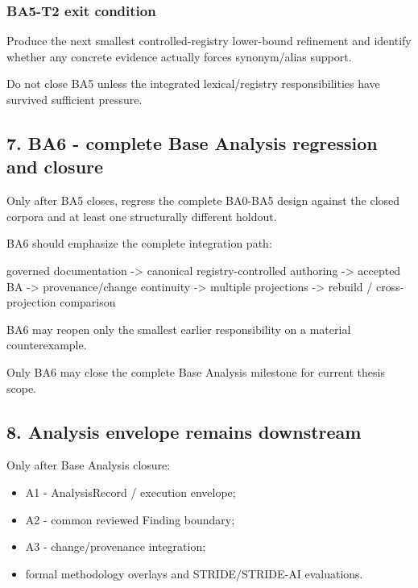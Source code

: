 \documentclass[
  10pt,
  a4paper,
]{article}
\newenvironment{Shaded}{}{}
\newcommand{\NormalTok}[1]{#1}
\providecommand{\tightlist}{%
  \setlength{\itemsep}{0pt}\setlength{\parskip}{0pt}}
\begin{document}
\subsubsection{BA5-T2 exit condition}\label{ba5-t2-exit-condition}

Produce the next smallest controlled-registry lower-bound refinement and
identify whether any concrete evidence actually forces synonym/alias
support.

Do not close BA5 unless the integrated lexical/registry responsibilities
have survived sufficient pressure.

\subsection{7. BA6 - complete Base Analysis regression and
closure}\label{ba6---complete-base-analysis-regression-and-closure}

Only after BA5 closes, regress the complete BA0-BA5 design against the
closed corpora and at least one structurally different holdout.

BA6 should emphasize the complete integration path:

\begin{Shaded}
\begin{Highlighting}[]
\NormalTok{governed documentation}
\NormalTok{ {-}\textgreater{} canonical registry{-}controlled authoring}
\NormalTok{ {-}\textgreater{} accepted BA}
\NormalTok{ {-}\textgreater{} provenance/change continuity}
\NormalTok{ {-}\textgreater{} multiple projections}
\NormalTok{ {-}\textgreater{} rebuild / cross{-}projection comparison}
\end{Highlighting}
\end{Shaded}

BA6 may reopen only the smallest earlier responsibility on a material
counterexample.

Only BA6 may close the complete Base Analysis milestone for current
thesis scope.

\subsection{8. Analysis envelope remains
downstream}\label{analysis-envelope-remains-downstream}

Only after Base Analysis closure:

\begin{itemize}
\tightlist
\item
  A1 - AnalysisRecord / execution envelope;
\item
  A2 - common reviewed Finding boundary;
\item
  A3 - change/provenance integration;
\item
  formal methodology overlays and STRIDE/STRIDE-AI evaluations.
\end{itemize}
\end{document}
